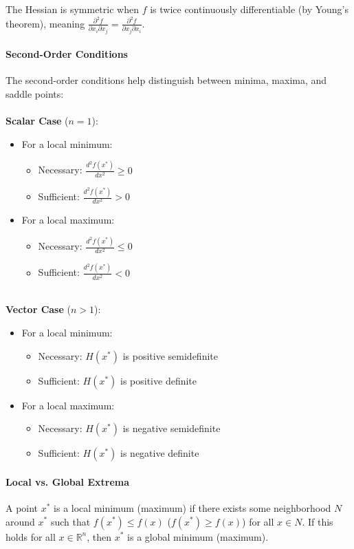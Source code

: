 The Hessian is symmetric when \(f\) is twice continuously differentiable (by Young's theorem), meaning \(\frac{\partial^2 f}{\partial x_i \partial x_j} = \frac{\partial^2 f}{\partial x_j \partial x_i}\).

\paragraph{Second-Order Conditions}
The second-order conditions help distinguish between minima, maxima, and saddle points:
\\\\
\textbf{Scalar Case} (\(n=1\)):
\begin{itemize}
    \item For a local minimum:
        \begin{itemize}
            \item Necessary: \(\frac{d^2 f(x^*)}{dx^2} \geq 0\)
            \item Sufficient: \(\frac{d^2 f(x^*)}{dx^2} > 0\)
        \end{itemize}
    \item For a local maximum:
        \begin{itemize}
            \item Necessary: \(\frac{d^2 f(x^*)}{dx^2} \leq 0\)
            \item Sufficient: \(\frac{d^2 f(x^*)}{dx^2} < 0\)
        \end{itemize}
\end{itemize}
\\
\textbf{Vector Case} (\(n>1\)):
\begin{itemize}
    \item For a local minimum:
        \begin{itemize}
            \item Necessary: \(H(x^*)\) is positive semidefinite
            \item Sufficient: \(H(x^*)\) is positive definite
        \end{itemize}
    \item For a local maximum:
        \begin{itemize}
            \item Necessary: \(H(x^*)\) is negative semidefinite
            \item Sufficient: \(H(x^*)\) is negative definite
        \end{itemize}
\end{itemize}

\paragraph{Local vs. Global Extrema}
A point \(x^*\) is a local minimum (maximum) if there exists some neighborhood \(N\) around \(x^*\) such that \(f(x^*) \leq f(x)\) (\(f(x^*) \geq f(x)\)) for all \(x \in N\). If this holds for all \(x \in \mathbb{R}^n\), then \(x^*\) is a global minimum (maximum).

